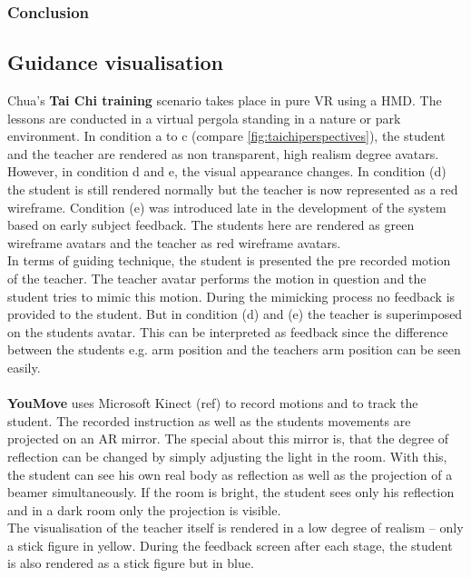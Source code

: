 \subsubsection{Conclusion}

\subsection{Guidance visualisation}
Chua's \textbf{Tai Chi training} scenario takes place in pure VR using a HMD. The lessons are conducted in a virtual pergola standing in a nature or park environment. In condition a to c (compare \ref{fig:taichiperspectives}), the student and the teacher are rendered as non transparent, high realism degree avatars. However, in condition d and e, the visual appearance changes. In condition (d) the student is still rendered normally but the teacher is now represented as a red wireframe. Condition (e) was introduced late in the development of the system based on early subject feedback. The students here are rendered as green wireframe avatars and the teacher as red wireframe avatars.\\
In terms of guiding technique, the student is presented the pre recorded motion of the teacher. The teacher avatar performs the motion in question and the student tries to mimic this motion. During the mimicking process no feedback is provided to the student. But in condition (d) and (e) the teacher is superimposed on the students avatar. This can be interpreted as feedback since the difference between the students e.g. arm position and the teachers arm position can be seen easily.\\ \\
\textbf{YouMove} uses Microsoft Kinect (\todo ref) to record motions and to track the student. The recorded instruction as well as the students movements are projected on an AR mirror. The special about this mirror is, that the degree of reflection can be changed by simply adjusting the light in the room. With this, the student can see his own real body as reflection as well as the projection of a beamer simultaneously. If the room is bright, the student sees only his reflection and in a dark room only the projection is visible.\\
The visualisation of the teacher itself is rendered in a low degree of realism \--- only a stick figure in yellow. During the feedback screen after each stage, the student is also rendered as a stick figure but in blue.\\
